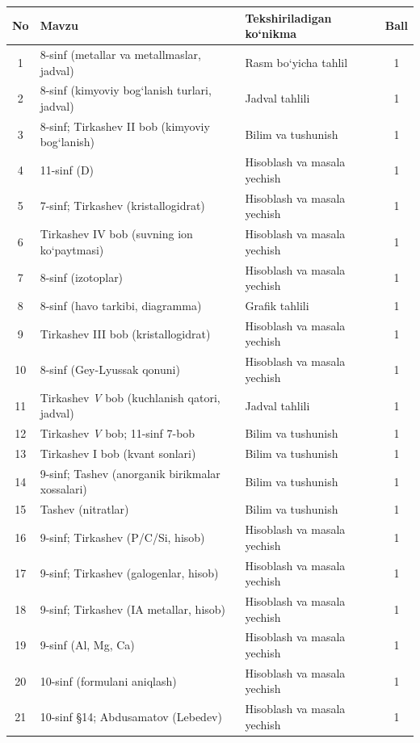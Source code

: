 \documentclass[11pt,a4paper]{article}
\begin{document}
{\small\noindent\begin{longtable}{|c|p{7.2cm}|p{5.4cm}|c|}\hline \textbf{No} & \textbf{Mavzu} & \textbf{Tekshiriladigan ko`nikma} & \textbf{Ball}\\\hline
1 & 8-sinf (metallar va metallmaslar, jadval) & Rasm bo`yicha tahlil & 1\\\hline
2 & 8-sinf (kimyoviy bog`lanish turlari, jadval) & Jadval tahlili & 1\\\hline
3 & 8-sinf; Tirkashev II bob (kimyoviy bog`lanish) & Bilim va tushunish & 1\\\hline
4 & 11-sinf (D) & Hisoblash va masala yechish & 1\\\hline
5 & 7-sinf; Tirkashev (kristallogidrat) & Hisoblash va masala yechish & 1\\\hline
6 & Tirkashev IV bob (suvning ion ko`paytmasi) & Hisoblash va masala yechish & 1\\\hline
7 & 8-sinf (izotoplar) & Hisoblash va masala yechish & 1\\\hline
8 & 8-sinf (havo tarkibi, diagramma) & Grafik tahlili & 1\\\hline
9 & Tirkashev III bob (kristallogidrat) & Hisoblash va masala yechish & 1\\\hline
10 & 8-sinf (Gey-Lyussak qonuni) & Hisoblash va masala yechish & 1\\\hline
11 & Tirkashev \textit{V} bob (kuchlanish qatori, jadval) & Jadval tahlili & 1\\\hline
12 & Tirkashev \textit{V} bob; 11-sinf 7-bob & Bilim va tushunish & 1\\\hline
13 & Tirkashev I bob (kvant sonlari) & Bilim va tushunish & 1\\\hline
14 & 9-sinf; Tashev (anorganik birikmalar xossalari) & Bilim va tushunish & 1\\\hline
15 & Tashev (nitratlar) & Bilim va tushunish & 1\\\hline
16 & 9-sinf; Tirkashev (P/C/Si, hisob) & Hisoblash va masala yechish & 1\\\hline
17 & 9-sinf; Tirkashev (galogenlar, hisob) & Hisoblash va masala yechish & 1\\\hline
18 & 9-sinf; Tirkashev (IA metallar, hisob) & Hisoblash va masala yechish & 1\\\hline
19 & 9-sinf (Al, Mg, Ca) & Hisoblash va masala yechish & 1\\\hline
20 & 10-sinf (formulani aniqlash) & Hisoblash va masala yechish & 1\\\hline
21 & 10-sinf \S{}14; Abdusamatov (Lebedev) & Hisoblash va masala yechish & 1\\\hline

\end{longtable}}
\end{document}
